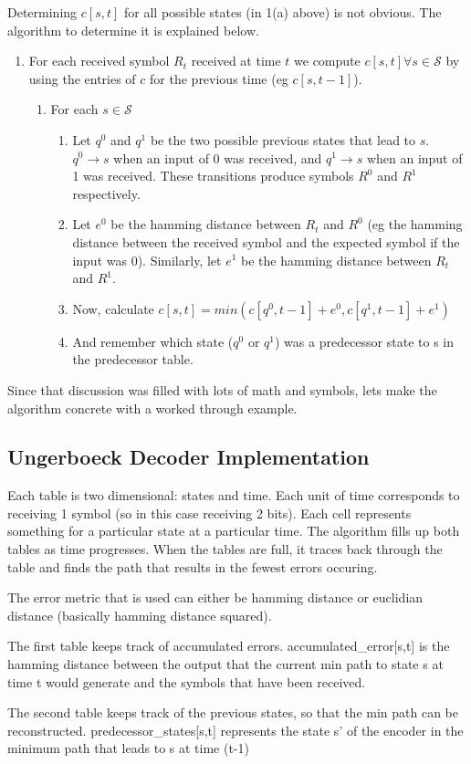 Determining $c[s,t]$ for all possible states (in 1(a) above) is not obvious.
The algorithm to determine it is explained below.  

\begin{enumerate}
\item For each received symbol $R_t$ received at time $t$ we compute 
       $c[s,t] \forall s \in \mathcal{S}$ by using the entries of $c$ for 
       the previous time (eg $c[s,t-1]$).
	\begin{enumerate}
	\item For each $s \in \mathcal{S}$
		\begin{enumerate}
		\item Let $q^0$ and $q^1$ be the two possible previous states
		       that lead to $s$. $q^0\rightarrow s$ when an input of 0
		       was received, and $q^1\rightarrow s$ when an input of 1 
		       was received. These transitions produce symbols $R^0$ and $R^1$
		       respectively.
		\item Let $e^0$ be the hamming distance between $R_t$ and $R^0$ (eg the hamming
		       distance between the received symbol and the expected symbol if the input was 0). 
		       Similarly, let $e^1$ be the hamming distance between $R_t$ and $R^1$.
		\item Now, calculate $c[s,t] = min(c[q^0,t-1] + e^0, c[q^1,t-1] + e^1)$
		\item And remember which state ($q^0$ or $q^1$) was a predecessor state to s in the 
		       predecessor table.
		\end{enumerate}
	\end{enumerate}
\end{enumerate}

Since that discussion was filled with lots of math and symbols, 
lets make the algorithm concrete with a worked through example.



\subsection{Ungerboeck Decoder Implementation}
Each table is two dimensional: states and time. Each unit of time corresponds to
receiving 1 symbol (so in this case receiving 2 bits). Each cell represents something
for a particular state at a particular time. The algorithm fills up both tables as
time progresses. When the tables are full, it traces back through the table and finds the
path that results in the fewest errors occuring.

The error metric that is used can either be hamming distance or euclidian distance (basically
hamming distance squared).

The first table keeps track of accumulated errors. accumulated\_error[s,t] is the hamming distance
between the output that the current min path to state s at time t would generate and the
symbols that have been received. 

The second table keeps track of the previous states, so that the min path
can be reconstructed. predecessor\_states[s,t] represents the state s' of the encoder
in the minimum path that leads to s at time (t-1) 


